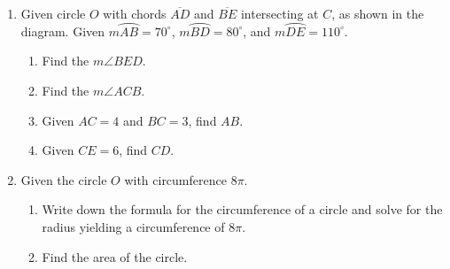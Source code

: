 \documentclass[12pt, twoside]{article}
\begin{document}
\begin{enumerate}
\item Given circle $O$ with chords $\overline{AD}$ and $\overline{BE}$ intersecting at $C$, as shown in the diagram. Given $m \wideparen{AB}=70^\circ$, $m \wideparen{BD}=80^\circ$, and $m \wideparen{DE}=110^\circ$.
  \begin{multicols}{2}
   \raggedcolumns
   \begin{enumerate}
     \item Find the $m\angle BED$. \vspace{1.3cm}
     \item Find the $m\angle ACB$. \vspace{2cm}
     \item Given $AC=4$ and $BC=3$, find $AB$. \vspace{2cm}
     \item Given $CE=6$, find $CD$. \vspace{2cm}
   \end{enumerate}
  \end{multicols}
\vspace{2cm}


\item Given the circle $O$ with circumference $8\pi$.
\begin{enumerate}
  \item Write down the formula for the circumference of a circle and solve for the radius yielding a circumference of $8\pi$. \vspace{1cm}
  \item Find the area of the circle.
\end{enumerate}



\end{enumerate}
\end{document}
